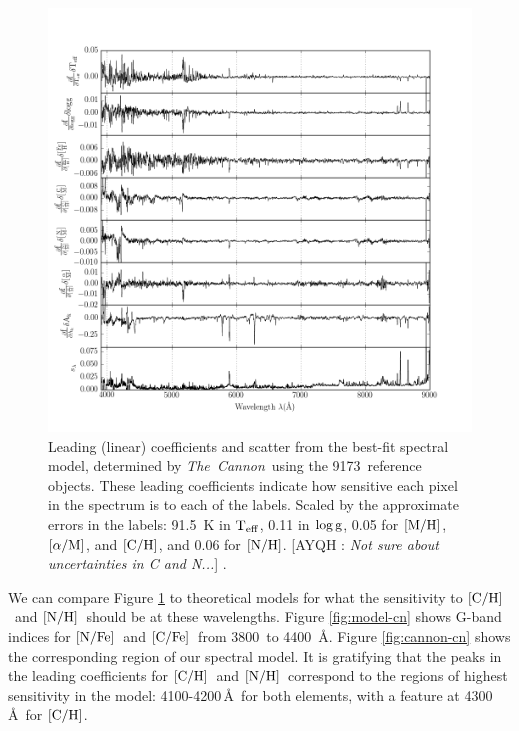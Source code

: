 \documentclass[12pt, preprint]{aastex}
\newcommand{\tc}{\textsl{The~Cannon}}
\newcommand{\teff}{\mbox{$\rm T_{eff}$}}
\newcommand{\logg}{\mbox{$\rm \log g$}}
\newcommand{\mh}{\mbox{$\rm [M/H]$}}
\newcommand{\alpham}{\mbox{$\rm [\alpha/M]$}}
\newcommand{\carbon}{\mbox{$\rm [C/H]$}}
\newcommand{\cfe}{\mbox{$\rm [C/Fe]$}}
\newcommand{\nitrogen}{\mbox{$\rm [N/H]$}}
\newcommand{\nfe}{\mbox{$\rm [N/Fe]$}}
\newcommand{\angstrom}{\mbox{\AA}}
\newcommand{\ntrobj}{9173}
\newcommand{\Comment}[2]{ [{\color{red}\sc #1 :} {{\color{cyan} \it #2}}]}
\begin{document}
\begin{figure}[!p]
\centering
\includegraphics[scale=0.7]{leading_coeffs.png}
\caption{Leading (linear) coefficients and scatter 
  from the best-fit spectral model, 
determined by \tc\ using the \ntrobj\ reference objects. 
These leading coefficients indicate how sensitive each pixel 
in the spectrum is to each of the labels. 
Scaled by the approximate errors in the labels:
91.5~K in \teff, 0.11 in \logg, 0.05 for \mh, \alpham, and \carbon, 
and 0.06 for \nitrogen. 
\Comment{AYQH}{Not sure about uncertainties in C and N...}
\citep{Holtzman2015}.}
\label{fig:leading-coeffs}
\end{figure}

We can compare Figure \ref{fig:leading-coeffs} to 
theoretical models for what the sensitivity to
\carbon\ and \nitrogen\ should be
at these wavelengths. Figure \ref{fig:model-cn}
shows G-band indices for \nfe\ and \cfe\ from
3800\, to 4400\, \angstrom. Figure \ref{fig:cannon-cn}
shows the corresponding region of our spectral model.
It is gratifying that the peaks in the leading coefficients
for \carbon\ and \nitrogen\ correspond to the regions
of highest sensitivity in the model: 4100-4200\,\angstrom\ 
for both elements, with a feature at 4300\,\angstrom\ for 
\carbon. 
\end{document}

